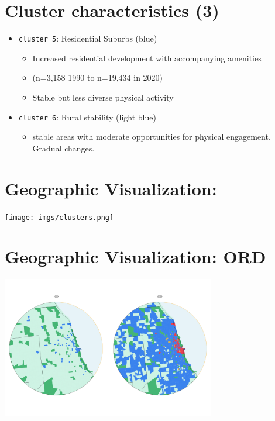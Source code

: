 \documentclass[
  letterpaper,
  DIV=11,
  numbers=noendperiod]{scrartcl}
\providecommand{\tightlist}{%
  \setlength{\itemsep}{0pt}\setlength{\parskip}{0pt}}\usepackage{longtable,booktabs,array}
\begin{document}
\hypertarget{cluster-characteristics-3}{%
\section{Cluster characteristics (3)}\label{cluster-characteristics-3}}

\begin{itemize}
\tightlist
\item
  \texttt{cluster\ 5}: Residential Suburbs (blue)

  \begin{itemize}
  \tightlist
  \item
    Increased residential development with accompanying amenities
  \item
    (n=3,158 1990 to n=19,434 in 2020)
  \item
    Stable but less diverse physical activity
  \end{itemize}
\item
  \texttt{cluster\ 6}: Rural stability (light blue)

  \begin{itemize}
  \tightlist
  \item
    stable areas with moderate opportunities for physical engagement.
    Gradual changes.
  \end{itemize}
\end{itemize}

\hypertarget{geographic-visualization}{%
\section{Geographic Visualization:}\label{geographic-visualization}}

\texttt{[image: imgs/clusters.png]}

\hypertarget{geographic-visualization-ord}{%
\section{Geographic Visualization:
ORD}\label{geographic-visualization-ord}}

\includegraphics[width=0.7\textwidth,height=\textheight]{imgs/ORD.png}
\end{document}
